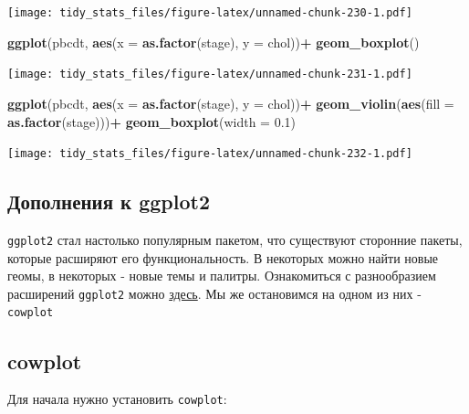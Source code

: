 \documentclass[]{book}
\newenvironment{Shaded}{\begin{snugshade}}{\end{snugshade}}
\newcommand{\KeywordTok}[1]{\textcolor[rgb]{0.13,0.29,0.53}{\textbf{#1}}}
\newcommand{\DataTypeTok}[1]{\textcolor[rgb]{0.13,0.29,0.53}{#1}}
\newcommand{\FloatTok}[1]{\textcolor[rgb]{0.00,0.00,0.81}{#1}}
\newcommand{\StringTok}[1]{\textcolor[rgb]{0.31,0.60,0.02}{#1}}
\newcommand{\OperatorTok}[1]{\textcolor[rgb]{0.81,0.36,0.00}{\textbf{#1}}}
\newcommand{\NormalTok}[1]{#1}
\begin{document}
\texttt{[image: tidy\_stats\_files/figure-latex/unnamed-chunk-230-1.pdf]}

\begin{Shaded}
\begin{Highlighting}[]
\KeywordTok{ggplot}\NormalTok{(pbcdt, }\KeywordTok{aes}\NormalTok{(}\DataTypeTok{x =} \KeywordTok{as.factor}\NormalTok{(stage), }\DataTypeTok{y =}\NormalTok{ chol))}\OperatorTok{+}
\StringTok{  }\KeywordTok{geom_boxplot}\NormalTok{()}
\end{Highlighting}
\end{Shaded}

\texttt{[image: tidy\_stats\_files/figure-latex/unnamed-chunk-231-1.pdf]}

\begin{Shaded}
\begin{Highlighting}[]
\KeywordTok{ggplot}\NormalTok{(pbcdt, }\KeywordTok{aes}\NormalTok{(}\DataTypeTok{x =} \KeywordTok{as.factor}\NormalTok{(stage), }\DataTypeTok{y =}\NormalTok{ chol))}\OperatorTok{+}
\StringTok{  }\KeywordTok{geom_violin}\NormalTok{(}\KeywordTok{aes}\NormalTok{(}\DataTypeTok{fill =} \KeywordTok{as.factor}\NormalTok{(stage)))}\OperatorTok{+}
\StringTok{  }\KeywordTok{geom_boxplot}\NormalTok{(}\DataTypeTok{width =} \FloatTok{0.1}\NormalTok{)}
\end{Highlighting}
\end{Shaded}

\texttt{[image: tidy\_stats\_files/figure-latex/unnamed-chunk-232-1.pdf]}

\subsection{Дополнения к
ggplot2}\label{ux434ux43eux43fux43eux43bux43dux435ux43dux438ux44f-ux43a-ggplot2}

\texttt{ggplot2} стал настолько популярным пакетом, что существуют
сторонние пакеты, которые расширяют его функциональность. В некоторых
можно найти новые геомы, в некоторых - новые темы и палитры.
Ознакомиться с разнообразием расширений \texttt{ggplot2} можно
\href{http://www.ggplot2-exts.org/gallery/}{здесь}. Мы же остановимся на
одном из них - \texttt{cowplot}

\subsection{cowplot}\label{cowplot}

Для начала нужно установить \texttt{cowplot}:
\end{document}
